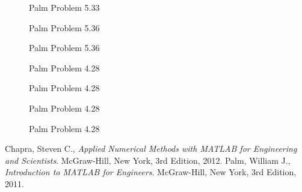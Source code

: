 \documentclass{article}
\begin{document}
\begin{figure}[htb!]
\begin{center}
\caption{Palm Problem 5.33}
\end{center}
\end{figure}

\begin{figure}[htb!]
\begin{center}
\caption{Palm Problem 5.36}
\end{center}
\end{figure}

\begin{figure}[htb!]
\begin{center}
\caption{Palm Problem 5.36}
\end{center}
\end{figure}

\begin{figure}[htb!]
\begin{center}
\caption{Palm Problem 4.28}
\end{center}
\end{figure}

\begin{figure}[htb!]
\begin{center}
\caption{Palm Problem 4.28}
\end{center}
\end{figure}

\begin{figure}[htb!]
\begin{center}
\caption{Palm Problem 4.28}
\end{center}
\end{figure}

\begin{figure}[htb!]
\begin{center}
\caption{Palm Problem 4.28}
\end{center}
\end{figure}

\clearpage


\begin{thebibliography}{9}
  Chapra, Steven C.,
  {\it Applied Numerical Methods with MATLAB for Engineering and Scientists}.
  McGraw-Hill, New York,
  3rd Edition,
  2012.
  Palm, William J.,
  {\it Introduction to MATLAB for Engineers}.
  McGraw-Hill, New York,
  3rd Edition,
  2011.
\end{thebibliography}
\end{document}
